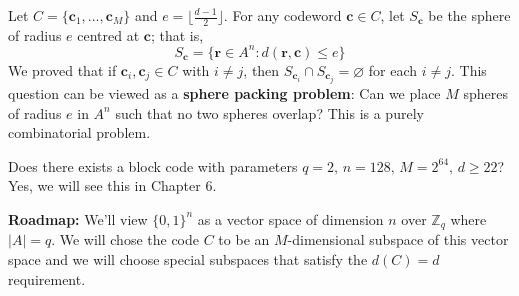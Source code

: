 Let $ C=\{\bm{c}_1,\ldots ,\bm{c}_M\} $ and $ e=\lfloor \frac{d-1}{2} \rfloor $.
For any codeword $ \bm{c}\in C $, let $ S_{\bm{c}} $ be the sphere of radius $ e $ centred at
$ \bm{c} $;
that is,
\[ S_{\bm{c}}= \{\bm{r}\in A^n:d(\bm{r},\bm{c})\leqslant e\} \]
We proved that if $ \bm{c}_i,\bm{c}_j\in C $ with $ i\neq j $,
then $ S_{\bm{c}_i}\cap S_{\bm{c}_j}= \varnothing $ for each $ i\neq j $.
This question can be viewed as a \textbf{sphere packing problem}:
Can we place $ M $ spheres of radius $ e $ in $ A^n $ such that
no two spheres overlap? This is a purely combinatorial problem.

Does there exists a block code with parameters
$ q=2,\,n=128,\,M=2^{64},\,d\geqslant 22 $? Yes, we will see this in Chapter 6.

\textbf{Roadmap:} We'll view $ \{0,1\}^{n} $ as a vector space of
dimension $ n $ over $ \mathbb{Z}_q $ where $ |A|=q $. We will chose the code
$ C $ to be an $ M $-dimensional subspace of this vector space
and we will choose special subspaces that satisfy the $ d(C)=d $ requirement.
